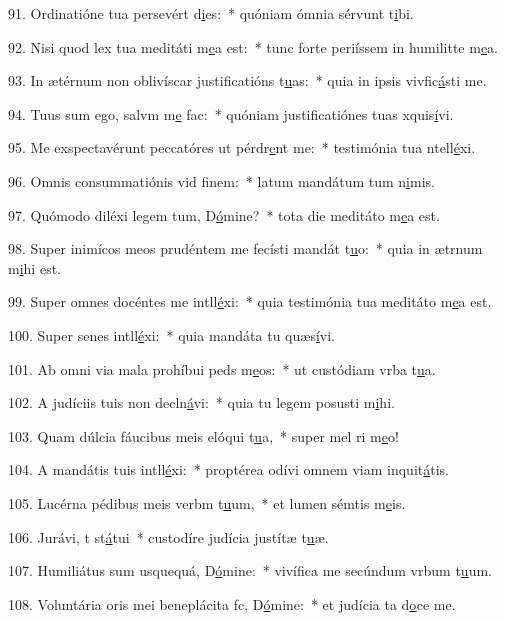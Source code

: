 91. Ordinatióne tua persevért d\uline{i}es:~* quóniam ómnia sérvunt t\uline{i}bi.\par 
92. Nisi quod lex tua meditáti m\uline{e}a est:~* tunc forte periíssem in humilitte m\uline{e}a.\par 
93. In ætérnum non oblivíscar justificatións t\uline{u}as:~* quia in ipsis vivfic\uline{á}sti me.\par 
94. Tuus sum ego, salvm m\uline{e} fac:~* quóniam justificatiónes tuas xquis\uline{í}vi.\par 
95. Me exspectavérunt peccatóres ut pérdr\uline{e}nt me:~* testimónia tua ntell\uline{é}xi.\par 
96. Omnis consummatiónis vid f\uline{i}nem:~* latum mandátum tum n\uline{i}mis.\par 
97. Quómodo diléxi legem tum, D\uline{ó}mine?~* tota die meditáto m\uline{e}a est.\par 
98. Super inimícos meos prudéntem me fecísti mandát t\uline{u}o:~* quia in ætrnum m\uline{i}hi est.\par 
99. Super omnes docéntes me intll\uline{é}xi:~* quia testimónia tua meditáto m\uline{e}a est.\par 
100. Super senes intll\uline{é}xi:~* quia mandáta tu quæs\uline{í}vi.\par 
101. Ab omni via mala prohíbui peds m\uline{e}os:~* ut custódiam vrba t\uline{u}a.\par 
102. A judíciis tuis non decln\uline{á}vi:~* quia tu legem posusti m\uline{i}hi.\par 
103. Quam dúlcia fáucibus meis elóqui t\uline{u}a,~* super mel ri m\uline{e}o!\par 
104. A mandátis tuis intll\uline{é}xi:~* proptérea odívi omnem viam inquit\uline{á}tis.\par 
105. Lucérna pédibus meis verbm t\uline{u}um,~* et lumen sémtis m\uline{e}is.\par 
106. Jurávi, t st\uline{á}tui~* custodíre judícia justítæ t\uline{u}æ.\par 
107. Humiliátus sum usquequá, D\uline{ó}mine:~* vivífica me secúndum vrbum t\uline{u}um.\par 
108. Voluntária oris mei beneplácita fc, D\uline{ó}mine:~* et judícia ta d\uline{o}ce me.\par 
